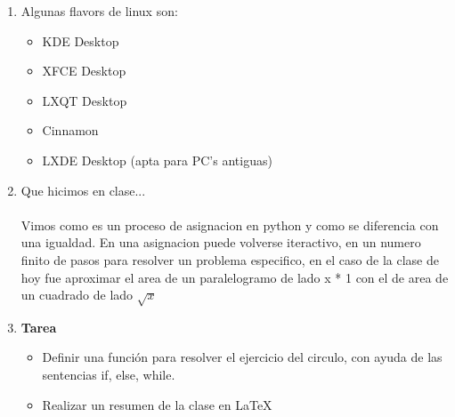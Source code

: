 \documentclass[letterpaper, 12pt, oneside]{article}%
\begin{document}
\begin{enumerate}
\begin{itemize}
	\end{itemize}%
	\item Algunas flavors de linux son:
		\begin{itemize}
			\item KDE Desktop
			\item XFCE Desktop
			\item LXQT Desktop
			\item Cinnamon
			\item LXDE Desktop (apta para PC's antiguas)
		\end{itemize}
	\item Que hicimos en clase... \\
	\\
	Vimos como es un proceso de asignacion en python y como se diferencia con una igualdad. En una asignacion puede volverse iteractivo, en un numero finito de pasos para resolver un problema especifico, en el caso de la clase de hoy fue aproximar el area de un paralelogramo de lado x * 1 con el de area de un cuadrado de lado $\sqrt{x}$
	\item \textbf{Tarea}
		\begin{itemize}
			\item Definir una función para resolver el ejercicio del circulo, con ayuda de las sentencias if, else, while.
			\item Realizar un resumen de la clase en LaTeX
		
			
		\end{itemize}
	
		
	
\end{enumerate}%
	
\end{document}
